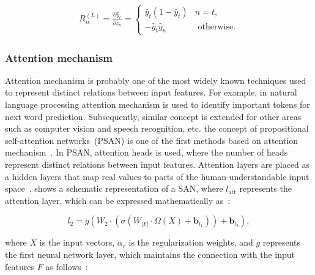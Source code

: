 \vspace{-2mm}
\begin{align}
        R_{n}^{(L)}=\frac{\partial \hat{y}_{t}}{\partial z_{n}}=\left\{\begin{array}{ll}
        {\hat{y}_{t}\left(1-\hat{y}_{t}\right)} & {n=t}, \\
        {-\hat{y}_{t} \hat{y}_{n}} & {\text { otherwise.}}
    \end{array}\right.
\end{align}

\subsubsection{Attention mechanism}
Attention mechanism is probably one of the most widely known techniques used to represent distinct relations between input features. For example, in natural language processing attention mechanism is used to identify important tokens for next word prediction. Subsequently, similar concept is extended for other areas such as computer vision and speech recognition, etc.%
the concept of propositional self-attention networks~(PSAN) is one of the first methods based on attention mechanism~\cite{vaswani2017attention}. In PSAN, attention heads is used, where the number of heads represent distinct relations between input features. Attention layers are placed as a hidden layers that map real values to parts of the human-understandable input space~\cite{vskrlj2020feature}. 
 shows a schematic representation of a SAN, where $l_{\text {att}}$ represents the attention layer, which can be expressed mathematically as~\cite{vskrlj2020feature}:  

\begin{equation}
    l_{2}=g\left(W_{2} \cdot\left(\sigma \left(W_{|F|} \cdot \Omega(X)+\boldsymbol{b}_{l_{1}}\right)\right)+\boldsymbol{b}_{l_{2}}\right),
\end{equation}

\hspace*{3.5mm} where $X$ is the input vectors, $\alpha_r$ is the regularization weights, and $g$ represents the first neural network layer, which maintains the connection with the input features $F$ as follows~\cite{vskrlj2020feature}: 

